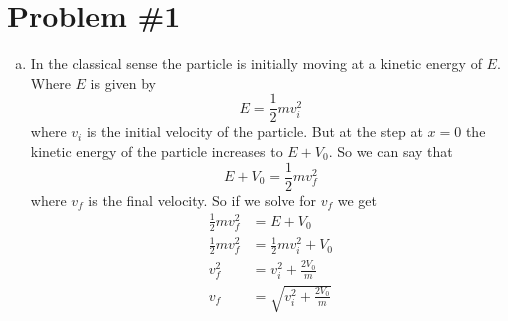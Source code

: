 \documentclass[11pt]{article}
\numberwithin{equation}{section}
\begin{document}


\section{Problem \#1}
\begin{enumerate}[(a)]
\item
In the classical sense the particle is initially moving at a kinetic energy of $E$. Where $E$ is given by
$$E = \frac{1}{2}mv_i^2$$
where $v_i$ is the initial velocity of the particle. But at the step at $x=0$ the kinetic energy of the particle increases to $E+V_0$. So we can say that
$$E+V_0 = \frac{1}{2}mv_f^2$$
where $v_f$ is the final velocity. So if we solve for $v_f$ we get
\begin{align*}
\frac{1}{2}mv_f^2 &= E+V_0\\
\frac{1}{2}mv_f^2 &= \frac{1}{2}mv_i^2+V_0\\
v_f^2 &= v_i^2+\frac{2V_0}{m}\\
v_f &= \sqrt{v_i^2+\frac{2V_0}{m}}
\end{align*}


\end{enumerate}
\end{document}
